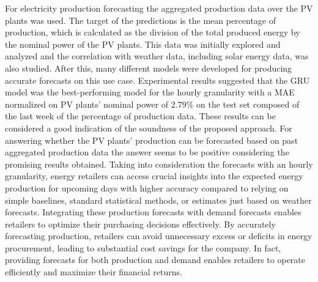 For electricity production forecasting the aggregated production data over the PV plants was used.
The target of the predictions is the mean percentage of production, which is calculated as the division of the total produced energy by the nominal power of the PV plants.
This data was initially explored and analyzed and the correlation with weather data, including solar energy data, was also studied.
After this, many different models were developed for producing accurate forecasts on this use case.
Experimental results suggested that the GRU model was the best-performing model for the hourly granularity with a MAE normalized on PV plants' nominal power of 2.79\% on the test set composed of the last week of the percentage of production data.
These results can be considered a good indication of the soundness of the proposed approach.
For answering whether the PV plants' production can be forecasted based on past aggregated production data the answer seems to be positive considering the promising results obtained.
Taking into consideration the forecasts with an hourly granularity, energy retailers can access crucial insights into the expected energy production for upcoming days with higher accuracy compared to relying on simple baselines, standard statistical methods, or estimates just based on weather forecasts.
Integrating these production forecasts with demand forecasts enables retailers to optimize their purchasing decisions effectively.
By accurately forecasting production, retailers can avoid unnecessary excess or deficits in energy procurement, leading to substantial cost savings for the company.
In fact, providing forecasts for both production and demand enables retailers to operate efficiently and maximize their financial returns.

